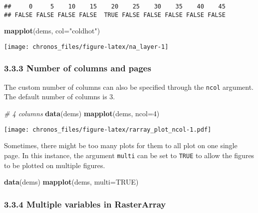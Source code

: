 \documentclass[]{article}
\newenvironment{Shaded}{\begin{snugshade}}{\end{snugshade}}
\newcommand{\KeywordTok}[1]{\textcolor[rgb]{0.13,0.29,0.53}{\textbf{#1}}}
\newcommand{\DataTypeTok}[1]{\textcolor[rgb]{0.13,0.29,0.53}{#1}}
\newcommand{\DecValTok}[1]{\textcolor[rgb]{0.00,0.00,0.81}{#1}}
\newcommand{\StringTok}[1]{\textcolor[rgb]{0.31,0.60,0.02}{#1}}
\newcommand{\CommentTok}[1]{\textcolor[rgb]{0.56,0.35,0.01}{\textit{#1}}}
\newcommand{\OtherTok}[1]{\textcolor[rgb]{0.56,0.35,0.01}{#1}}
\newcommand{\NormalTok}[1]{#1}
\begin{document}
\begin{verbatim}
##     0     5    10    15    20    25    30    35    40    45 
## FALSE FALSE FALSE FALSE  TRUE FALSE FALSE FALSE FALSE FALSE
\end{verbatim}

\begin{Shaded}
\begin{Highlighting}[]
\KeywordTok{mapplot}\NormalTok{(dems, }\DataTypeTok{col=}\StringTok{"coldhot"}\NormalTok{)}
\end{Highlighting}
\end{Shaded}

\begin{center}\texttt{[image: chronos\_files/figure-latex/na\_layer-1]} \end{center}

\subsubsection{3.3.3 Number of columns and
pages}\label{number-of-columns-and-pages}

The custom number of columns can also be specified through the
\texttt{ncol} argument. The default number of columns is 3.

\begin{Shaded}
\begin{Highlighting}[]
\CommentTok{# 4 columns}
\KeywordTok{data}\NormalTok{(dems)}
\KeywordTok{mapplot}\NormalTok{(dems, }\DataTypeTok{ncol=}\DecValTok{4}\NormalTok{)}
\end{Highlighting}
\end{Shaded}

\texttt{[image: chronos\_files/figure-latex/rarray\_plot\_ncol-1.pdf]}

Sometimes, there might be too many plots for them to all plot on one
single page. In this instance, the argument \texttt{multi} can be set to
\texttt{TRUE} to allow the figures to be plotted on multiple figures.

\begin{Shaded}
\begin{Highlighting}[]
\KeywordTok{data}\NormalTok{(dems)}
\KeywordTok{mapplot}\NormalTok{(dems, }\DataTypeTok{multi=}\OtherTok{TRUE}\NormalTok{)}
\end{Highlighting}
\end{Shaded}

\subsubsection{3.3.4 Multiple variables in
RasterArray}\label{multiple-variables-in-rasterarray}
\end{document}
